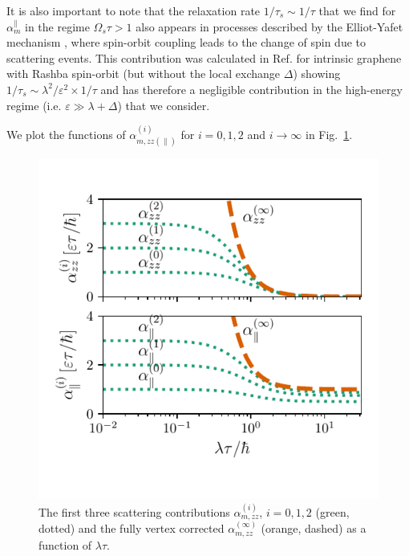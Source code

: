 It is also important to note that the relaxation rate $1/\tau_s\sim 1/\tau$ that we find for $\alpha_m^{\parallel}$ in the regime $\Omega_s \tau > 1$ also appears in processes described by the Elliot-Yafet mechanism \cite{elliott_theory_1954, yafet_g_1963}, where spin-orbit coupling leads to the change of spin due to scattering events. This contribution was calculated in Ref. \cite{huertas-hernando_spin-orbit-mediated_2009} for intrinsic graphene with Rashba spin-orbit (but without the local exchange $\Delta$) showing $1/\tau_s \sim \lambda^2/\varepsilon^2 \times 1/\tau $ and has therefore a negligible contribution in the high-energy regime (i.e. $\varepsilon \gg \lambda + \Delta$) that we consider.

We plot the functions of $\alpha_{m,zz(\parallel)}^{(i)}$ for $i=0,1,2$ and $i\rightarrow\infty$ in Fig.~\ref{fig:alpha_plot}. 
\begin{figure}
    \centering
    \includegraphics[width=\linewidth]{gfx/Chapter04/alpha_plot2}
    \caption{The first three scattering contributions $\alpha_{m,zz}^{(i)}$, $i=0,1,2$ (green, dotted) and the fully vertex corrected $\alpha_{m,zz}^{(\infty)}$ (orange, dashed) as a function of $\lambda \tau$. }
    \label{fig:alpha_plot}
\end{figure}

